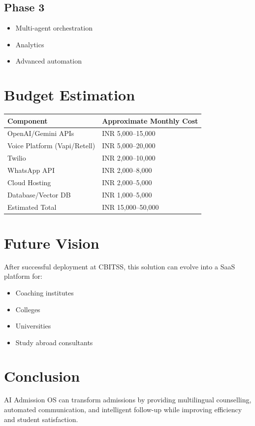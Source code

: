 \documentclass[11pt,a4paper]{article}
\begin{document}
\subsection{Phase 3}
\begin{itemize}
\item Multi-agent orchestration
\item Analytics
\item Advanced automation
\end{itemize}

\section{Budget Estimation}

\begin{tabular}{|p{7cm}|p{4cm}|}
\hline
Component & Approximate Monthly Cost \\
\hline
OpenAI/Gemini APIs & INR 5,000--15,000 \\
Voice Platform (Vapi/Retell) & INR 5,000--20,000 \\
Twilio & INR 2,000--10,000 \\
WhatsApp API & INR 2,000--8,000 \\
Cloud Hosting & INR 2,000--5,000 \\
Database/Vector DB & INR 1,000--5,000 \\
\hline
Estimated Total & INR 15,000--50,000 \\
\hline
\end{tabular}

\section{Future Vision}

After successful deployment at CBITSS, this solution can evolve into a SaaS platform for:
\begin{itemize}
\item Coaching institutes
\item Colleges
\item Universities
\item Study abroad consultants
\end{itemize}

\section{Conclusion}

AI Admission OS can transform admissions by providing multilingual counselling,
automated communication, and intelligent follow-up while improving efficiency
and student satisfaction.
\end{document}
